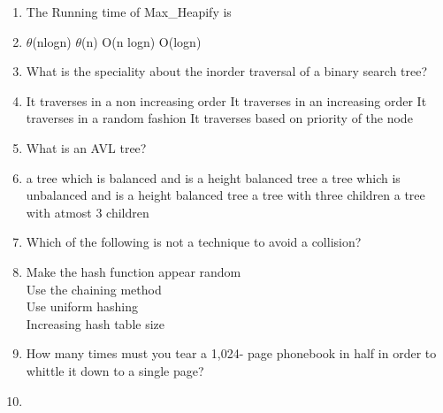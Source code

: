 \documentclass[12pt ,a4paper]{exam}
\begin{document}
	\begin{enumerate}[start=1,label={\bfseries Q\arabic*)}]
		\itemsep0.2em
		
		\item The Running time of Max\_Heapify is
		\item[] 
		\begin{oneparchoices}
			\choice $\theta$(nlogn)  %
			\choice $\theta$(n) 
			\choice O(n logn) 
			\choice O(logn) 
		\end{oneparchoices}
		
		\item What is the speciality about the inorder traversal of a binary search tree?
		\item[] 
		\begin{oneparchoices}
			\choice It traverses in a non increasing order %
			\choice It traverses in an increasing order 
			\choice It traverses in a random fashion
			\choice It traverses based on priority of the node
		\end{oneparchoices}
	
		\item What is an AVL tree?
		\item[] 
		\begin{oneparchoices}
			\choice a tree which is balanced and is a height balanced tree  %
	    	\choice a tree which is unbalanced and is a height balanced tree 
	    	\choice a tree with three children
	    	\choice a tree with atmost 3 children
		\end{oneparchoices}
	
		\item Which of the following is not a technique to avoid a collision?
		\item[] 
		\begin{oneparchoices}
			\choice  Make the hash function appear random\\%
			\choice Use the chaining method\\
			\choice Use uniform hashing\\
			\choice Increasing hash table size
	 	\end{oneparchoices}
 	 \item How many times must you tear a 1,024- page phonebook in half in order to whittle it down to a single page?
 	 	\item[] 
 	 \begin{oneparchoices}
 	 	\choice 10
 	 	\choice 32
 	 	\choice 512
 	 \end{oneparchoices}
  

\end{enumerate}
\end{document}
